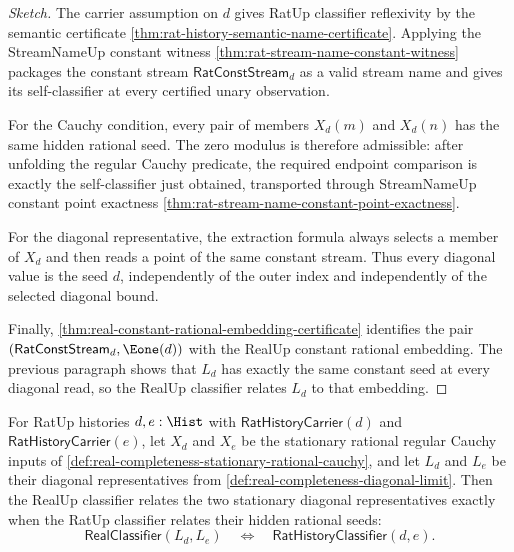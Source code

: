 \begin{proof}[Sketch]
The carrier assumption on $d$ gives RatUp classifier reflexivity by the semantic certificate \autoref{thm:rat-history-semantic-name-certificate}. Applying the StreamNameUp constant witness \autoref{thm:rat-stream-name-constant-witness} packages the constant stream $\mathsf{RatConstStream}_d$ as a valid stream name and gives its self-classifier at every certified unary observation.

For the Cauchy condition, every pair of members $X_d(m)$ and $X_d(n)$ has the same hidden rational seed. The zero modulus is therefore admissible: after unfolding the regular Cauchy predicate, the required endpoint comparison is exactly the self-classifier just obtained, transported through StreamNameUp constant point exactness \autoref{thm:rat-stream-name-constant-point-exactness}.

For the diagonal representative, the extraction formula always selects a member of $X_d$ and then reads a point of the same constant stream. Thus every diagonal value is the seed $d$, independently of the outer index and independently of the selected diagonal bound.

Finally, \autoref{thm:real-constant-rational-embedding-certificate} identifies the pair $(\mathsf{RatConstStream}_d,\Eone(d))$ with the RealUp constant rational embedding. The previous paragraph shows that $L_d$ has exactly the same constant seed at every diagonal read, so the RealUp classifier relates $L_d$ to that embedding.
\end{proof}


\begin{theorem}
\label{thm:real-completeness-stationary-embedding-classifier-full-correspondence}
For RatUp histories $d,e:\Hist$ with $\mathsf{RatHistoryCarrier}(d)$ and
$\mathsf{RatHistoryCarrier}(e)$, let $X_d$ and $X_e$ be the stationary rational
regular Cauchy inputs of
\autoref{def:real-completeness-stationary-rational-cauchy}, and let $L_d$ and
$L_e$ be their diagonal representatives from
\autoref{def:real-completeness-diagonal-limit}. Then the RealUp classifier
relates the two stationary diagonal representatives exactly when the RatUp
classifier relates their hidden rational seeds:
$$
\mathsf{RealClassifier}(L_d,L_e)
\quad\Longleftrightarrow\quad
\mathsf{RatHistoryClassifier}(d,e).
$$
\end{theorem}

